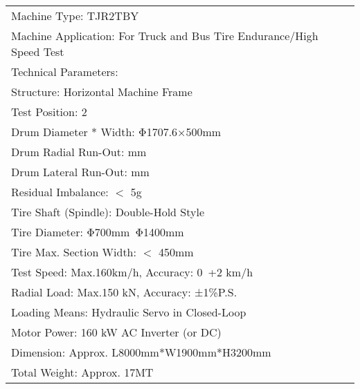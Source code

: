 \documentclass[varwidth=\maxdimen]{standalone}
\begin{document}
\begin{tabular}{ ||l|| }
	\toprule
	Machine Type: TJR2TBY \\
	Machine Application: For Truck and Bus Tire Endurance/High Speed Test \\
	Technical Parameters: \\
	Structure: Horizontal Machine Frame \\
	Test Position: 2 \\
	Drum Diameter * Width: Φ1707.6×500mm \\
	Drum Radial Run-Out: \leq 0.20 mm \\
	Drum Lateral Run-Out: \leq 0.20 mm \\
	Residual Imbalance: $<$ 5g \\
	Tire Shaft (Spindle): Double-Hold Style \\
	Tire Diameter: Φ700mm~Φ1400mm \\
	Tire Max. Section Width: $<$ 450mm \\
	Test Speed: Max.160km/h, Accuracy: 0~+2 km/h \\
	Radial Load: Max.150 kN, Accuracy: ±1\%P.S. \\
	Loading Means: Hydraulic Servo in Closed-Loop \\
	Motor Power: 160 kW AC Inverter (or DC) \\
	Dimension: Approx. L8000mm*W1900mm*H3200mm \\
	Total Weight: Approx. 17MT \\
	\bottomrule
\end{tabular}
\end{document}
